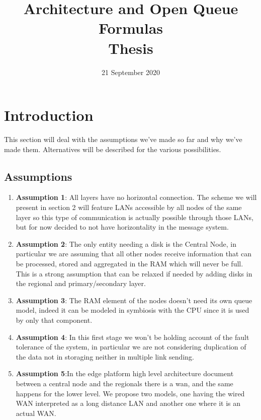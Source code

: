 \documentclass[11pt]{article}
\title {Architecture and Open Queue Formulas \\ \bigskip \large Thesis}
\date{21 September 2020}
\begin{document}
\maketitle
\section{Introduction}
This section will deal with the assumptions we've made so far and why we've made them. Alternatives will be described for the various possibilities.\\
\subsection{Assumptions}
\begin{enumerate}
\item \textbf{Assumption 1}: All layers have no horizontal connection. The scheme we will present in section 2 will feature LANs accessible by all nodes of the same layer so this type of communication is actually possible through those LANs, but for now decided to not have horizontality in the message system.
\item \textbf{Assumption 2}: The only entity needing a disk is the Central Node, in particular we are assuming that all other nodes receive information that can be processed, stored and aggregated in the RAM which will never be full. This is a strong assumption that can be relaxed if needed by adding disks in the regional and primary/secondary layer.
\item \textbf{Assumption 3}: The RAM element of the nodes doesn't need its own queue model, indeed it can be modeled in symbiosis with the CPU since it is used by only that component.
\item \textbf{Assumption 4}: In this first stage we won't be holding account of the fault tolerance of the system, in particular we are not considering duplication of the data not in storaging neither in multiple link sending.
\item \textbf{Assumption 5}:In the edge platform high level architecture document between a central node and the regionals there is a wan, and the same happens for the lower level. We propose two models, one having the wired WAN interpreted as a long distance LAN and another one where it is an actual WAN.
\end{enumerate}
\end{document}
